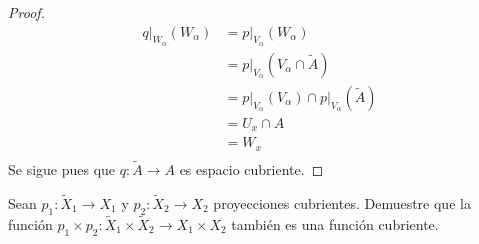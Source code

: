 \documentclass[12pt]{report}
\newcounter{it}
\theoremstyle{largebreak}
\newcommand\cf[3]{\ensuremath{#1:#2\rightarrow#3}}
\begin{document}
\begin{proof}
\begin{equation*}
            \begin{split}
                q\Big|_{W_\alpha}(W_\alpha)&=p\Big|_{V_\alpha}(W_\alpha)\\
                &=p\Big|_{V_\alpha}(V_\alpha\cap\widetilde{A})\\
                &=p\Big|_{V_\alpha}(V_\alpha)\cap p\Big|_{V_\alpha}(\widetilde{A})\\
                &=U_x\cap A\\
                &=W_x\\
            \end{split}
        \end{equation*}
        Se sigue pues que $\cf{q}{\widetilde{A}}{A}$ es espacio cubriente.
    \end{proof}

    \begin{excer}
        Sean $\cf{p_1}{\widetilde{X}_1}{X_1}$ y $\cf{p_2}{\widetilde{X}_2}{X_2}$ proyecciones cubrientes. Demuestre que la función $\cf{p_1\times p_2}{\widetilde{X}_1\times\widetilde{X}_2}{X_1\times X_2}$ también es una función cubriente.
    \end{excer}
\end{document}
